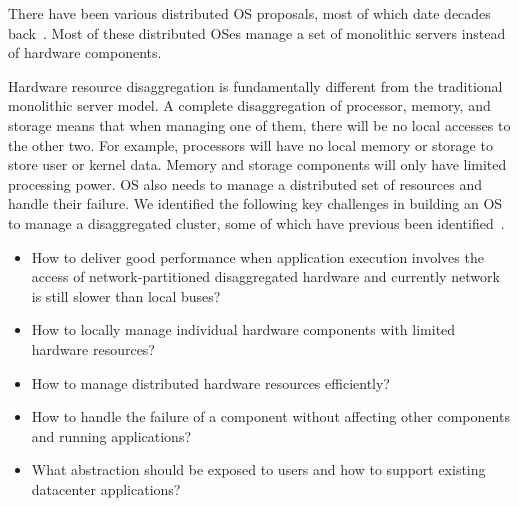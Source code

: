 \documentclass[10pt,times,twocolumn]{z2-article}
\begin{document}
There have been various distributed OS proposals,
most of which date decades back~\cite{Amoeba-Experience,Sprite,MOSIX}. %
Most of these distributed OSes manage a set of monolithic servers
instead of hardware components.

Hardware resource disaggregation is fundamentally different from the traditional monolithic server model.
A complete disaggregation of processor, memory, and storage 
means that when managing one of them, there will be no local accesses to the other two.
For example, processors will have no local memory or storage to store user or kernel data.
Memory and storage components will only have limited processing power. %
OS also needs to manage a distributed set of resources and handle their failure.
We identified the following key challenges in building an OS to manage a disaggregated cluster,
some of which have previous been identified~\cite{HP-MemoryOS}.

\begin{itemize}
\vspace{-0.05in}
\item How to deliver good performance when application execution involves the access of network-partitioned disaggregated hardware
and currently network is still slower than local buses?

\vspace{-0.05in}
\item How to locally manage individual hardware components with limited hardware resources?


\vspace{-0.05in}
\item How to manage distributed hardware resources efficiently?

\vspace{-0.05in}
\item How to handle the failure of a component without affecting other components and running applications?

\vspace{-0.05in}
\item What abstraction should be exposed to users and how to support existing datacenter applications?

\vspace{-0.05in}
\end{itemize}
\end{document}
